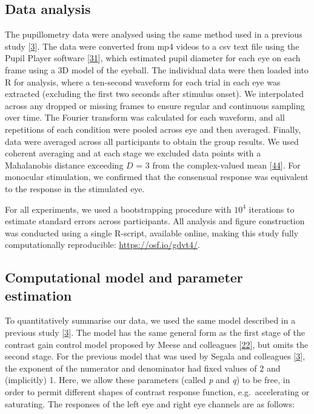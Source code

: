 \documentclass[
]{article}
\begin{document}
\hypertarget{data-analysis}{%
\subsection{Data analysis}\label{data-analysis}}

The pupillometry data were analysed using the same method used in a previous study {[}\protect\hyperlink{ref-Segala2023}{3}{]}. The data were converted from mp4 videos to a csv text file using the Pupil Player software {[}\protect\hyperlink{ref-Kassner2014}{31}{]}, which estimated pupil diameter for each eye on each frame using a 3D model of the eyeball. The individual data were then loaded into R for analysis, where a ten-second waveform for each trial in each eye was extracted (excluding the first two seconds after stimulus onset). We interpolated across any dropped or missing frames to ensure regular and continuous sampling over time. The Fourier transform was calculated for each waveform, and all repetitions of each condition were pooled across eye and then averaged. Finally, data were averaged across all participants to obtain the group results. We used coherent averaging and at each stage we excluded data points with a Mahalanobis distance exceeding \(D\) = 3 from the complex-valued mean {[}\protect\hyperlink{ref-Baker2021}{44}{]}. For monocular stimulation, we confirmed that the consensual response was equivalent to the response in the stimulated eye.

For all experiments, we used a bootstrapping procedure with \ensuremath{10^{4}} iterations to estimate standard errors across participants. All analysis and figure construction was conducted using a single R-script, available online, making this study fully computationally reproducible: \url{https://osf.io/gdvt4/}.

\hypertarget{computational-model-and-parameter-estimation}{%
\subsection{Computational model and parameter estimation}\label{computational-model-and-parameter-estimation}}

To quantitatively summarise our data, we used the same model described in a previous study {[}\protect\hyperlink{ref-Segala2023}{3}{]}. The model has the same general form as the first stage of the contrast gain control model proposed by Meese and colleagues {[}\protect\hyperlink{ref-Meese2006}{22}{]}, but omits the second stage. For the previous model that was used by Segala and colleagues {[}\protect\hyperlink{ref-Segala2023}{3}{]}, the exponent of the numerator and denominator had fixed values of 2 and (implicitly) 1. Here, we allow these parameters (called \emph{p} and \emph{q}) to be free, in order to permit different shapes of contrast response function, e.g.~accelerating or saturating. The responses of the left eye and right eye channels are as follows:
\end{document}
